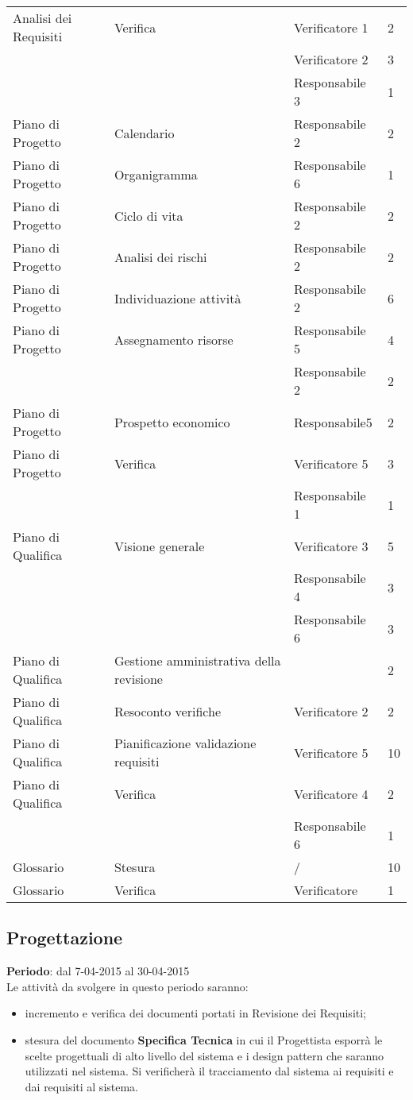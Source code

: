 {{\begin{longtable} [c]{| l | l | l | l |}
		Analisi dei Requisiti & Verifica & Verificatore 1 & 2\\
		&	&	Verificatore 2 & 3\\
		&	&	Responsabile 3 & 1\\
		Piano di Progetto & Calendario & Responsabile 2 & 2\\
		Piano di Progetto & Organigramma & Responsabile 6 & 1\\
		Piano di Progetto & Ciclo di vita & Responsabile 2 & 2\\
		Piano di Progetto & Analisi dei rischi & Responsabile 2 & 2\\
		Piano di Progetto & Individuazione attività & Responsabile 2 & 6\\
		Piano di Progetto & Assegnamento risorse & Responsabile 5 & 4\\
		&	&	Responsabile 2 & 2\\
		Piano di Progetto & Prospetto economico & Responsabile5 & 2\\
		Piano di Progetto & Verifica &  Verificatore 5 & 3\\
		&	&	Responsabile 1 & 1\\
		Piano di Qualifica & Visione generale & Verificatore 3 & 5\\
		&	&	Responsabile 4 & 3\\
		&	&	Responsabile 6 & 3\\
		Piano di Qualifica & Gestione amministrativa della revisione & & 2\\
		Piano di Qualifica & Resoconto verifiche & Verificatore 2 & 2\\
		Piano di Qualifica & Pianificazione validazione requisiti & Verificatore 5 & 10\\
		Piano di Qualifica & Verifica & Verificatore 4 & 2\\
		&	&	Responsabile 6 & 1\\
		Glossario & Stesura & / & 10\\
		Glossario & Verifica & Verificatore & 1\\
	\end{longtable}
}

\newpage
\subsection{Progettazione}{
	\textbf{Periodo}: dal 7-04-2015 al 30-04-2015 \\
	
	Le attività da svolgere in questo periodo saranno:
	\begin{itemize}
		\item incremento e verifica dei documenti portati in Revisione dei Requisiti;
		\item stesura del documento \textbf{Specifica Tecnica} in cui il Progettista esporrà le scelte progettuali di alto livello del sistema e i design pattern che saranno utilizzati nel sistema. Si verificherà il tracciamento dal sistema ai requisiti e dai requisiti al sistema.
	\end{itemize}
	
}}
